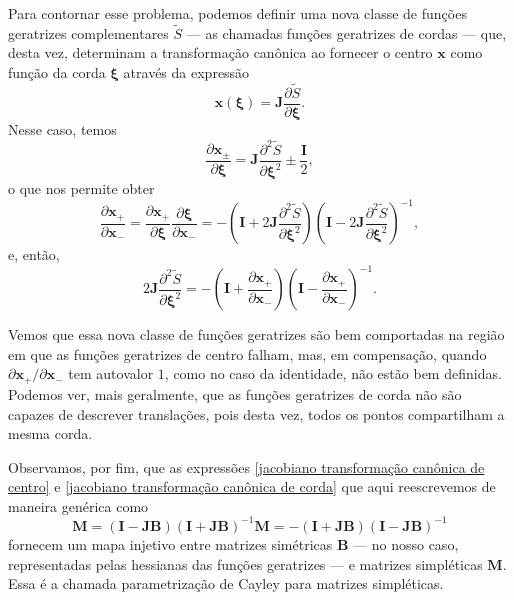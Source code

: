 \documentclass[
	12pt,
	oneside,			%
	a4paper,			%
	english,			%
	brazil				%
	]{abntex2}
\theoremstyle{definition}
\begin{document}
Para contornar esse problema, podemos definir uma nova classe de funções geratrizes complementares $\tilde{S}$ — as chamadas funções geratrizes de cordas — que, desta vez, determinam a transformação canônica ao fornecer o centro $\mathbf{x}$ como função da corda $\boldsymbol{\xi}$ através da expressão
\begin{equation}
    \mathbf{x} \left( \boldsymbol{\xi} \right) = \mathbf{J} \frac{\partial \tilde{S}}{\partial \boldsymbol{\xi}}.
\end{equation}
Nesse caso, temos
\begin{equation}
    \frac{\partial \mathbf{x}_{\pm}}{ \partial \boldsymbol{\xi}} =  \mathbf{J}\frac{\partial^2 \tilde{S}}{\partial \boldsymbol{\xi}^2} \pm \frac{\mathbf{I}}{2},
\end{equation}
o que nos permite obter
\begin{equation}
\label{jacobiano transformação canônica de corda}
    \frac{\partial \mathbf{x}_+}{ \partial \mathbf{x}_-} = \frac{\partial \mathbf{x}_+}{ \partial \boldsymbol{\xi}} \frac{\partial \boldsymbol{\xi}}{ \partial \mathbf{x}_-} = -\left(\mathbf{I} + 2 \mathbf{J} \frac{\partial^2 \tilde{S}}{\partial \boldsymbol{\xi}^2}\right) \left(\mathbf{I} - 2 \mathbf{J} \frac{\partial^2 \tilde{S}}{\partial \boldsymbol{\xi}^2}\right)^{-1},
\end{equation}
e, então,
\begin{equation}
    2 \mathbf{J} \frac{\partial^2 \tilde{S}}{\partial \boldsymbol{\xi}^2} = -\left(\mathbf{I} + \frac{\partial \mathbf{x}_+}{\partial \mathbf{x}_-} \right) \left(\mathbf{I} - \frac{\partial \mathbf{x}_+}{\partial \mathbf{x}_-} \right)^{-1}.
\end{equation}

Vemos que essa nova classe de funções geratrizes são bem comportadas na região em que as funções geratrizes de centro falham, mas, em compensação, quando $\partial \mathbf{x}_+/\partial \mathbf{x}_-$ tem autovalor $1$, como no caso da identidade, não estão bem definidas. Podemos ver, mais geralmente, que as funções geratrizes de corda não são capazes de descrever translações, pois desta vez, todos os pontos compartilham a mesma corda.

Observamos, por fim, que as expressões \eqref{jacobiano transformação canônica de centro} e \eqref{jacobiano transformação canônica de corda} que aqui reescrevemos de maneira genérica como
\begin{subequations}
    \begin{equation}
    \label{cayley 1}
        \mathbf{M} = \left( \mathbf{I}- \mathbf{JB} \right)\left( \mathbf{I}+ \mathbf{JB} \right)^{-1}
    \end{equation}
    \begin{equation}
        \mathbf{M} = -\left( \mathbf{I} + \mathbf{JB} \right)\left( \mathbf{I} - \mathbf{JB} \right)^{-1}
    \end{equation}
\end{subequations}
fornecem um mapa injetivo entre matrizes simétricas $\mathbf{B}$ — no nosso caso, representadas pelas hessianas das funções geratrizes — e matrizes simpléticas $\mathbf{M}$. Essa é a chamada parametrização de Cayley \cite{arnol2013dynamical} para matrizes simpléticas.
\end{document}
